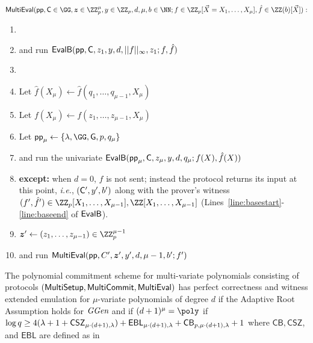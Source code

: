  \begin{mdframed}
\begin{minipage}{\textwidth}
			$\pro{MultiEval}(\params, \gr{C}\in \GG, \boldsymbol{z}\in \ZZ^\mu_p,y \in \ZZ_p, d,\mu,b \in \NN; f \in \ZZ_p[\vec{X}= X_1,\ldots,X_\mu], \hat{f}\in \ZZ(b)[\vec{X}]) :$
			\begin{enumerate}[nolistsep]
			\item {} 
			\item \pcind[1] \prover and \verifier run $\pro{EvalB}(\params,\gr{C},z_1,y,d,||f||_\infty,z_1;f,\hat{f})$ 
			\item \pcelse
			\item \pcind[1] Let $\hat{f}(X_\mu)\gets \hat{f}(q_1,\dots,q_{\mu-1},X_\mu)$
			\item \pcind[1] Let $f(X_\mu)\gets f(z_1,\dots,z_{\mu-1},X_\mu)$

			\item \pcind[1] Let $\crs_\mu \gets \{\lambda,\GG,\gr{g},p,q_\mu\}$
			\item \pcind[1] \prover and \verifier run the univariate $\pro{EvalB}(\params_\mu,\gr{C},z_\mu,y,d,q_\mu;f(X),\hat{f}(X))$
			\item \pcind[2] \textbf{except:} when $d=0$, $f$ is not sent; instead the protocol returns its input at this point, \emph{i.e.}, $(\gr{C}',y',b')$ along with the prover's witness $(f',\hat{f}') \in \ZZ_p[X_1,\dots,X_{\mu-1}],\ZZ[X_1,\dots,X_{\mu-1}]$ (Lines~\ref{line:basestart}-\ref{line:baseend} of $\pro{EvalB}$). 
			\item \pcind[1]$\boldsymbol{z}'\gets (z_1,\dots,z_{\mu-1})\in \ZZ_p^{\mu-1}$
			\item \pcind[1]\prover and \verifier run $\pro{MultiEval}(\crs,C',\boldsymbol{z}',y',d,\mu-1,b';f')$
		    \end{enumerate}
      \end{minipage}
\end{mdframed}


\begin{theorem}
\label{thm:mvariate}
	The polynomial commitment scheme for multi-variate polynomials consisting of protocols $(\pro{MultiSetup},\pro{MultiCommit},\pro{MultiEval})$ has perfect correctness and witness extended emulation for $\mu$-variate polynomials of degree $d$ if the Adaptive Root Assumption holds for $\ggen$  and if $(d+1)^\mu=\poly$ if $\log q \geq 4(\lambda + 1 + \CSZ[\mu \cdot (d+1)]) + \EBL[\mu \cdot (d+1)] + \CorrectnessBound[\mu \cdot (d+1)] + 1$ where $\mathsf{CB},\mathsf{CSZ}$, and $\mathsf{EBL}$ are defined as in 
\end{theorem}



